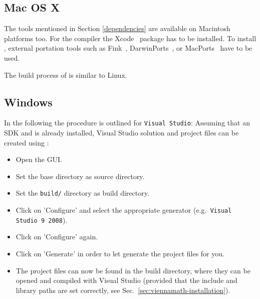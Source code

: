 
\subsection{Mac OS X}
\label{apple}
The tools mentioned in Section \ref{dependencies} are available on 
Macintosh platforms too. 
For the {\GCC} compiler the Xcode~\cite{xcode} package has to be installed.
To install {\CMake}, external portation tools such as
Fink~\cite{fink}, DarwinPorts~\cite{darwinports}, 
or MacPorts~\cite{macports} have to be used. 

The build process of {\ViennaMath} is similar to Linux.

\subsection{Windows}
In the following the procedure is outlined for \texttt{Visual Studio}: Assuming
that an {\OpenCL} SDK and {\CMake} is already installed, Visual Studio solution
and project files can be created using {\CMake}:
\begin{itemize}
\item Open the {\CMake} GUI.
\item Set the {\ViennaMath} base directory as source directory.
\item Set the \texttt{build/} directory as build directory.
\item Click on 'Configure' and select the appropriate generator
(e.g.~\texttt{Visual Studio 9 2008}).
\item Click on 'Configure' again.
\item Click on 'Generate' in order to let {\CMake} generate the project files for you.
\item The project files can now be found in the {\ViennaMath} build directory,
where they can be opened and compiled with Visual Studio (provided that the
include and library paths are set correctly, see
Sec.~\ref{sec:viennamath-installation}).
\end{itemize}

























